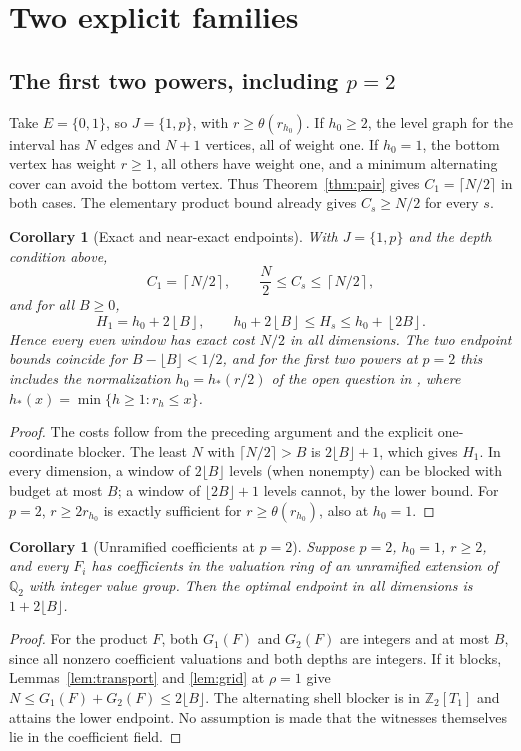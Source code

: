 \documentclass[11pt]{article}
\newtheorem{corollary}[theorem]{Corollary}
\theoremstyle{definition}
\newcommand{\ceil}[1]{\left\lceil #1\right\rceil}
\newcommand{\floor}[1]{\left\lfloor #1\right\rfloor}
\begin{document}
\section{Two explicit families}
\subsection{The first two powers, including $p=2$}
\label{sec:two}
Take $E=\{0,1\}$, so $J=\{1,p\}$, with $r\ge\theta(r_{h_0})$. If $h_0\ge2$, the level graph for the interval has $N$ edges and $N+1$ vertices, all of weight one. If $h_0=1$, the bottom vertex has weight $r\ge1$, all others have weight one, and a minimum alternating cover can avoid the bottom vertex. Thus Theorem~\ref{thm:pair} gives $C_1=\lceil N/2\rceil$ in both cases. The elementary product bound already gives $C_s\ge N/2$ for every $s$.

\begin{corollary}[Exact and near-exact endpoints]\label{cor:two}
With $J=\{1,p\}$ and the depth condition above,
\[
 C_1=\ceil{N/2},\qquad \frac N2\le C_s\le\ceil{N/2},
\]
and for all $B\ge0$,
\begin{equation}\label{eq:twoendpoint}
 H_1=h_0+2\floor B,\qquad
 h_0+2\floor B\le H_s\le h_0+\floor{2B}.
\end{equation}
Hence every even window has exact cost $N/2$ in all dimensions. The two endpoint bounds coincide for $B-\lfloor B\rfloor<1/2$, and for the first two powers at $p=2$ this includes the normalization $h_0=h_*(r/2)$ of the open question in \cite{tors}, where $h_*(x)=\min\{h\ge1:r_h\le x\}$.
\end{corollary}
\begin{proof}
The costs follow from the preceding argument and the explicit one-coordinate blocker. The least $N$ with $\lceil N/2\rceil>B$ is $2\lfloor B\rfloor+1$, which gives $H_1$. In every dimension, a window of $2\lfloor B\rfloor$ levels (when nonempty) can be blocked with budget at most $B$; a window of $\lfloor2B\rfloor+1$ levels cannot, by the lower bound. For $p=2$, $r\ge 2r_{h_0}$ is exactly sufficient for $r\ge\theta(r_{h_0})$, also at $h_0=1$.
\end{proof}

\begin{corollary}[Unramified coefficients at $p=2$]\label{cor:unram}
Suppose $p=2$, $h_0=1$, $r\ge2$, and every $F_i$ has coefficients in the valuation ring of an unramified extension of $\mathbb Q_2$ with integer value group. Then the optimal endpoint in \emph{all} dimensions is $1+2\lfloor B\rfloor$.
\end{corollary}
\begin{proof}
For the product $F$, both $G_1(F)$ and $G_2(F)$ are integers and at most $B$, since all nonzero coefficient valuations and both depths are integers. If it blocks, Lemmas~\ref{lem:transport} and \ref{lem:grid} at $\rho=1$ give $N\le G_1(F)+G_2(F)\le2\lfloor B\rfloor$. The alternating shell blocker is in $\mathbb Z_2[T_1]$ and attains the lower endpoint. No assumption is made that the witnesses themselves lie in the coefficient field.
\end{proof}
\end{document}
